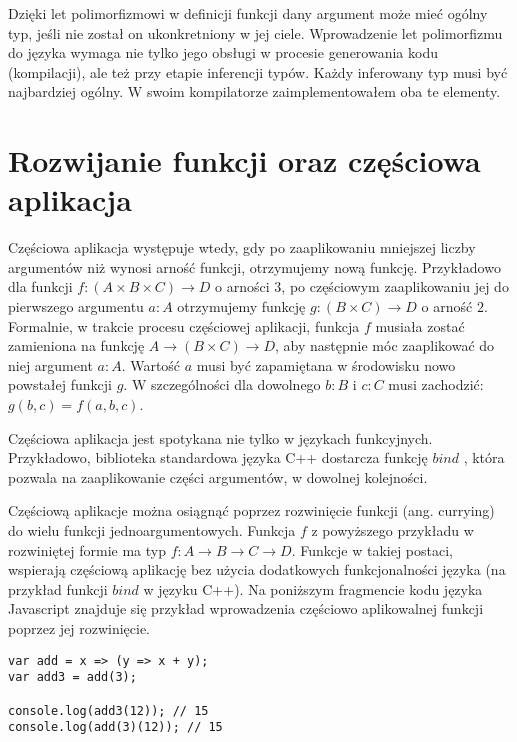 \documentclass[declaration,shortabstract]{iithesis}
\begin{document}
Dzięki let polimorfizmowi w definicji funkcji dany argument może 
mieć ogólny typ, jeśli nie został on ukonkretniony w jej ciele.
Wprowadzenie let polimorfizmu do języka wymaga nie tylko jego obsługi 
w procesie generowania kodu (kompilacji), ale też przy etapie inferencji typów.
Każdy inferowany typ musi być najbardziej ogólny. W swoim kompilatorze 
zaimplementowałem oba te elementy. 


\section{Rozwijanie funkcji oraz częściowa aplikacja}

Częściowa aplikacja występuje wtedy, gdy po zaaplikowaniu mniejszej liczby 
argumentów niż wynosi arność funkcji, otrzymujemy nową funkcję. Przykładowo 
dla funkcji $f: (A \times B \times C) \rightarrow D$ o arności $3$,
po częściowym zaaplikowaniu jej do pierwszego 
argumentu $a : A$ otrzymujemy funkcję $g : (B \times C) \rightarrow D$ o arność $2$.
Formalnie, w trakcie procesu częściowej aplikacji,
funkcja $f$ musiała zostać zamieniona na funkcję 
$A \rightarrow (B \times C) \rightarrow D$, aby następnie móc zaaplikować do niej 
argument $a : A$. Wartość $a$ musi być zapamiętana w środowisku nowo powstałej 
funkcji $g$.
W szczególności
dla dowolnego $b : B$ i $c : C$  musi zachodzić: $g(b, c) = f(a, b, c)$. 

Częściowa aplikacja jest spotykana nie tylko w językach funkcyjnych. 
Przykładowo, biblioteka standardowa języka C++ dostarcza funkcję
$bind$ \cite{cpp_bind}, która pozwala na zaaplikowanie części argumentów,
w dowolnej kolejności. 

Częściową aplikacje można osiągnąć poprzez rozwinięcie funkcji (ang. currying) 
do wielu funkcji jednoargumentowych. Funkcja $f$ z powyższego przykładu 
w rozwiniętej
formie ma typ $f : A \rightarrow B \rightarrow C \rightarrow D$. Funkcje w 
takiej postaci, wspierają częściową aplikację bez użycia dodatkowych 
funkcjonalności języka (na przykład funkcji $bind$ w języku C++).
Na poniższym fragmencie kodu języka Javascript
znajduje się przykład wprowadzenia częściowo aplikowalnej funkcji 
poprzez jej rozwinięcie.

\begin{lstlisting}[frame=lines]
var add = x => (y => x + y);
var add3 = add(3);

console.log(add3(12)); // 15
console.log(add(3)(12)); // 15
\end{lstlisting}
\end{document}

